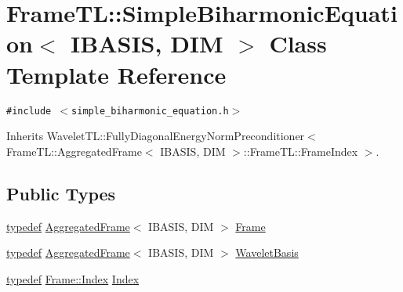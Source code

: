 \hypertarget{classFrameTL_1_1SimpleBiharmonicEquation}{
\section{FrameTL::SimpleBiharmonicEquation$<$ IBASIS, DIM $>$ Class Template Reference}
\label{classFrameTL_1_1SimpleBiharmonicEquation}
}
{\tt \#include $<$simple\_\-biharmonic\_\-equation.h$>$}

Inherits WaveletTL::FullyDiagonalEnergyNormPreconditioner$<$ FrameTL::AggregatedFrame$<$ IBASIS, DIM $>$::FrameTL::FrameIndex $>$.

\subsection*{Public Types}
\begin{CompactItemize}
\item 
\hyperlink{structtypedef}{typedef} \hyperlink{classFrameTL_1_1AggregatedFrame}{AggregatedFrame}$<$ IBASIS, DIM $>$ \hyperlink{classFrameTL_1_1SimpleBiharmonicEquation_b92f00909f0e7a185bcdede446570546}{Frame}
\item 
\hyperlink{structtypedef}{typedef} \hyperlink{classFrameTL_1_1AggregatedFrame}{AggregatedFrame}$<$ IBASIS, DIM $>$ \hyperlink{classFrameTL_1_1SimpleBiharmonicEquation_feee9bcf85adb1115a5487773a5d8d32}{WaveletBasis}
\item 
\hyperlink{structtypedef}{typedef} \hyperlink{classFrameTL_1_1FrameIndex}{Frame::Index} \hyperlink{classFrameTL_1_1SimpleBiharmonicEquation_35f42b79db1b8e156c3cdb3c22122e74}{Index}
\end{CompactItemize}

